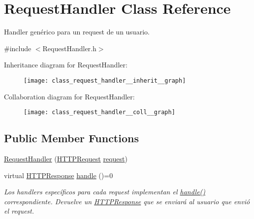\hypertarget{class_request_handler}{}\section{Request\+Handler Class Reference}
\label{class_request_handler}


Handler genérico para un request de un usuario.  




{\ttfamily \#include $<$Request\+Handler.\+h$>$}



Inheritance diagram for Request\+Handler\+:
\nopagebreak
\begin{figure}[H]
\begin{center}
\leavevmode
\texttt{[image: class\_request\_handler\_\_inherit\_\_graph]}
\end{center}
\end{figure}


Collaboration diagram for Request\+Handler\+:
\nopagebreak
\begin{figure}[H]
\begin{center}
\leavevmode
\texttt{[image: class\_request\_handler\_\_coll\_\_graph]}
\end{center}
\end{figure}
\subsection*{Public Member Functions}
\begin{DoxyCompactItemize}
\item 
\hyperlink{class_request_handler_ad33af675073689c2218049195503f65b}{Request\+Handler} (\hyperlink{class_h_t_t_p_request}{H\+T\+T\+P\+Request} \hyperlink{class_request_handler_a95913fcd2f05853ba9532b7bacd3a044}{request})
\item 
virtual \hyperlink{class_h_t_t_p_response}{H\+T\+T\+P\+Response} \hyperlink{class_request_handler_ada5c3c1669e6c2e4b46923a42b1fdab6}{handle} ()=0
\begin{DoxyCompactList}\small\item\em Los handlers específicos para cada request implementan el \hyperlink{class_request_handler_ada5c3c1669e6c2e4b46923a42b1fdab6}{handle()} correspondiente. Devuelve un \hyperlink{class_h_t_t_p_response}{H\+T\+T\+P\+Response} que se enviará al usuario que envió el request. \end{DoxyCompactList}\end{DoxyCompactItemize}
